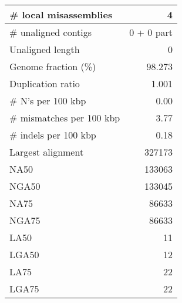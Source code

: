 \documentclass[12pt,a4paper]{article}
\begin{document}
\begin{table}[ht]
\begin{center}
\begin{tabular}{|l*{1}{|r}|}
\# local misassemblies & 4 \\ \hline
\# unaligned contigs & 0 + 0 part \\ \hline
Unaligned length & 0 \\ \hline
Genome fraction (\%) & 98.273 \\ \hline
Duplication ratio & 1.001 \\ \hline
\# N's per 100 kbp & 0.00 \\ \hline
\# mismatches per 100 kbp & 3.77 \\ \hline
\# indels per 100 kbp & 0.18 \\ \hline
Largest alignment & 327173 \\ \hline
NA50 & 133063 \\ \hline
NGA50 & 133045 \\ \hline
NA75 & 86633 \\ \hline
NGA75 & 86633 \\ \hline
LA50 & 11 \\ \hline
LGA50 & 12 \\ \hline
LA75 & 22 \\ \hline
LGA75 & 22 \\ \hline
\end{tabular}
\end{center}
\end{table}
\end{document}
